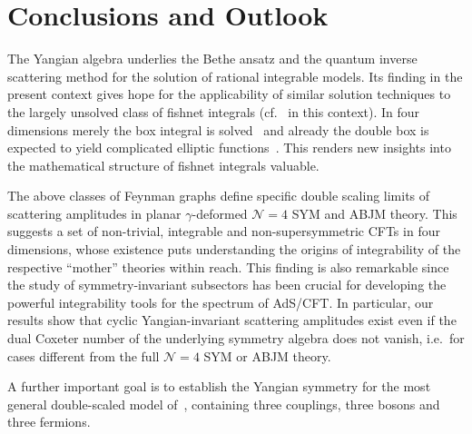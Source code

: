 \documentclass[twocolumn,preprintnumbers,prl,superscriptaddress]{revtex4-1}
\begin{document}

\section{Conclusions and Outlook}



The Yangian algebra underlies the Bethe ansatz and the quantum inverse scattering method for the solution of rational integrable models. Its finding in the present context gives hope for the applicability of similar solution techniques to the largely unsolved class of fishnet integrals (cf.\ \cite{Basso:2017jwq} in this context). In four dimensions merely the box integral is solved~\cite{ussyukina1993approach} and already the double box is expected to yield complicated elliptic functions~\cite{CaronHuot:2012ab}. This renders new insights into the mathematical structure of fishnet integrals valuable.



The above classes of Feynman graphs define specific double scaling limits  of scattering amplitudes in  planar \(\gamma\)-deformed $\mathcal{N}=4$ SYM and  ABJM theory.  This suggests a set of non-trivial, integrable and non-supersymmetric CFTs in four dimensions, whose existence puts understanding the origins of integrability of the respective ``mother'' theories within reach.
This finding is also remarkable since the study of symmetry-invariant  subsectors has been crucial for developing the powerful integrability tools for the spectrum of AdS/CFT.
In particular, our results show that cyclic Yangian-invariant scattering amplitudes exist even if the dual Coxeter number of the underlying symmetry algebra does not vanish, i.e.\ for cases different from the full $\mathcal{N}=4$ SYM or ABJM theory. 

A further important goal
is to establish the Yangian symmetry for the most general double-scaled model of~\cite{Gurdogan:2015csr}, containing three couplings, three bosons and three fermions.






\end{document}

